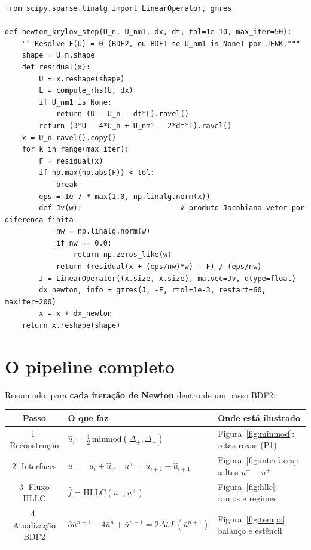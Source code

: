 \documentclass[10pt,a4paper]{article}
\newcommand{\fh}{\hat f}
\newcommand{\ub}{\bar u}
\newcommand{\uh}{\hat u}
\begin{document}
\begin{lstlisting}[caption={A mesma etapa com Newton--Krylov sem Jacobiana (JFNK). O produto Jacobiana-vetor é a diferença finita \eqref{eq:jfnk}; o GMRES resolve o sistema linear de cada iteração de Newton de forma aproximada (resíduo linear relativo $10^{-3}$ basta).},label=lst:jfnk]
from scipy.sparse.linalg import LinearOperator, gmres

def newton_krylov_step(U_n, U_nm1, dx, dt, tol=1e-10, max_iter=50):
    """Resolve F(U) = 0 (BDF2, ou BDF1 se U_nm1 is None) por JFNK."""
    shape = U_n.shape
    def residual(x):
        U = x.reshape(shape)
        L = compute_rhs(U, dx)
        if U_nm1 is None:
            return (U - U_n - dt*L).ravel()
        return (3*U - 4*U_n + U_nm1 - 2*dt*L).ravel()
    x = U_n.ravel().copy()
    for k in range(max_iter):
        F = residual(x)
        if np.max(np.abs(F)) < tol:
            break
        eps = 1e-7 * max(1.0, np.linalg.norm(x))
        def Jv(w):                       # produto Jacobiana-vetor por diferenca finita
            nw = np.linalg.norm(w)
            if nw == 0.0:
                return np.zeros_like(w)
            return (residual(x + (eps/nw)*w) - F) / (eps/nw)
        J = LinearOperator((x.size, x.size), matvec=Jv, dtype=float)
        dx_newton, info = gmres(J, -F, rtol=1e-3, restart=60, maxiter=200)
        x = x + dx_newton
    return x.reshape(shape)
\end{lstlisting}

\section{O pipeline completo}

Resumindo, para \textbf{cada iteração de Newton} dentro de um passo BDF2:

\begin{center}
\renewcommand{\arraystretch}{1.4}
\begin{tabular}{@{}c l l@{}}
\toprule
\textbf{Passo} & \textbf{O que faz} & \textbf{Onde está ilustrado}\\
\midrule
\textcircled{1} Reconstrução & $\uh_i=\tfrac12\,\mathrm{minmod}(\Delta_+,\Delta_-)$ & Figura~\ref{fig:minmod}: retas roxas (P1)\\
\textcircled{2} Interfaces & $u^-=\ub_i+\uh_i$,\ \ $u^+=\ub_{i+1}-\uh_{i+1}$ & Figura~\ref{fig:interfaces}: saltos $u^- - u^+$\\
\textcircled{3} Fluxo HLLC & $\fh=\mathrm{HLLC}(u^-,u^+)$ & Figura~\ref{fig:hllc}: ramos e regimes\\
\textcircled{4} Atualização BDF2 & $3\ub^{n+1}-4\ub^n+\ub^{n-1}=2\Delta t\,L(\ub^{n+1})$ & Figura~\ref{fig:tempo}: balanço e estêncil\\
\bottomrule
\end{tabular}
\end{center}
\end{document}
